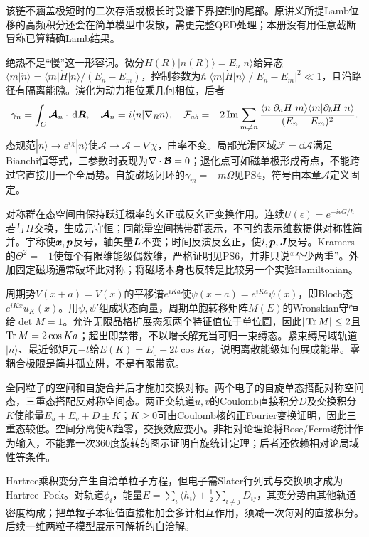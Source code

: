 该链不涵盖极短时的二次存活或极长时受谱下界控制的尾部。原讲义所提Lamb位移的高频积分还会在简单模型中发散，需更完整QED处理；本册没有用任意截断冒称已算精确Lamb结果。

绝热不是“慢”这一形容词。微分$H(R)|n(R)\rangle=E_n|n\rangle$给异态
$\langle m|\dot n\rangle=\langle m|\dot H|n\rangle/(E_n-E_m)$，控制参数为$\hbar|\langle m|\dot H|n\rangle|/|E_n-E_m|^2\ll1$，且沿路径有隔离能隙。演化为动力相位乘几何相位，后者
\[
 \gamma_n=\int_C\boldsymbol{\mathcal A}_n\cdot\,\mathrm d\boldsymbol{R},\quad
 \boldsymbol{\mathcal A}_n=i\langle n|\nabla_Rn\rangle,\quad
 \mathcal F_{ab}=-2\operatorname{Im}
 \sum_{m\ne n}\frac{\langle n|\partial_aH|m\rangle
 \langle m|\partial_bH|n\rangle}{(E_n-E_m)^2}.
\]
态规范$|n\rangle\to e^{i\chi}|n\rangle$使$\mathcal A\to\mathcal A-\nabla\chi$，曲率不变。局部光滑区域$\mathcal F=\dd\mathcal A$满足Bianchi恒等式，三参数时表现为$\nabla\cdot\boldsymbol{\mathcal B}=0$；退化点可如磁单极形成奇点，不能跨过它直接用一个全局势。自旋磁场闭环的$\gamma_m=-m\Omega$见PS4，符号由本章$\mathcal A$定义固定。

对称群在态空间由保持跃迁概率的幺正或反幺正变换作用。连续$U(\epsilon)=e^{-i\epsilon G/\hbar}$若与$H$交换，生成元守恒；同能量空间携带群表示，不可约表示维数提供对称性简并。宇称使$\boldsymbol{x},\boldsymbol{p}$反号，轴矢量$\boldsymbol{L}$不变；时间反演反幺正，使$i,\boldsymbol{p},\boldsymbol{J}$反号。Kramers的$\Theta^2=-1$使每个有限维能级偶数维，严格证明见PS6，并非只说“至少两重”。外加固定磁场通常破坏此对称；将磁场本身也反转是比较另一个实验Hamiltonian。

周期势$V(x+a)=V(x)$的平移谱$e^{iKa}$使$\psi(x+a)=e^{iKa}\psi(x)$，即Bloch态$e^{iKx}u_K(x)$。用$\psi,\psi'$组成状态向量，周期单胞转移矩阵$M(E)$的Wronskian守恒给$\det M=1$。允许无限晶格扩展态须两个特征值位于单位圆，因此$|\operatorname{Tr} M|\le2$且$\operatorname{Tr} M=2\cos Ka$；超出即禁带，不以增长解充当可归一束缚态。紧束缚局域轨道$|n\rangle$、最近邻矩元$-t$给$E(K)=E_0-2t\cos Ka$，说明离散能级如何展成能带。零耦合极限是简并孤立阱，不是有限带宽。

全同粒子的空间和自旋合并后才施加交换对称。两个电子的自旋单态搭配对称空间态，三重态搭配反对称空间态。两正交轨道$u,v$的Coulomb直接积分$D$及交换积分$K$使能量$E_{u}+E_v+D\pm K$；$K\ge0$可由Coulomb核的正Fourier变换证明，因此三重态较低。空间分离使$K$趋零，交换效应变小。非相对论理论将Bose/Fermi统计作为输入，不能靠一次360度旋转的图示证明自旋统计定理；后者还依赖相对论局域性等条件。

Hartree乘积变分产生自洽单粒子方程，但电子需Slater行列式与交换项才成为Hartree--Fock。对轨道$\phi_i$，能量$E=\sum_i\langle h_i\rangle+\frac12\sum_{i\ne j}D_{ij}$，其变分势由其他轨道密度构成；把单粒子本征值直接相加会多计相互作用，须减一次每对的直接积分。后续一维两粒子模型展示可解析的自洽解。

